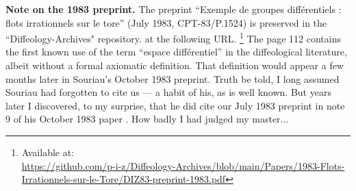 \medskip
\textbf{Note on the 1983 preprint.}
The preprint ``Exemple de groupes différentiels : flots irrationnels sur le tore'' (July 1983, CPT-83/P.1524) is preserved in the ``Diffeology-Archives" repository.
at the following URL.%
\footnote{Available at: \\ \url{https://github.com/p-i-z/Diffeology-Archives/blob/main/Papers/1983-Flots-Irrationnels-sur-le-Tore/DIZ83-preprint-1983.pdf}}
The page 112 contains the first known use of the term ``espace différentiel'' in the diffeological literature,
albeit without a formal axiomatic definition.
That definition would appear a few months later in Souriau's October 1983 preprint.
Truth be told,
I long assumed Souriau had forgotten to cite us --- a habit of his,
as is well known.
But years later I discovered,
to my surprise,
that he did cite our July 1983 preprint in note 9 of his October 1983 paper \cite{Sou84}.
How badly I had judged my master...
\markboth{}{}
